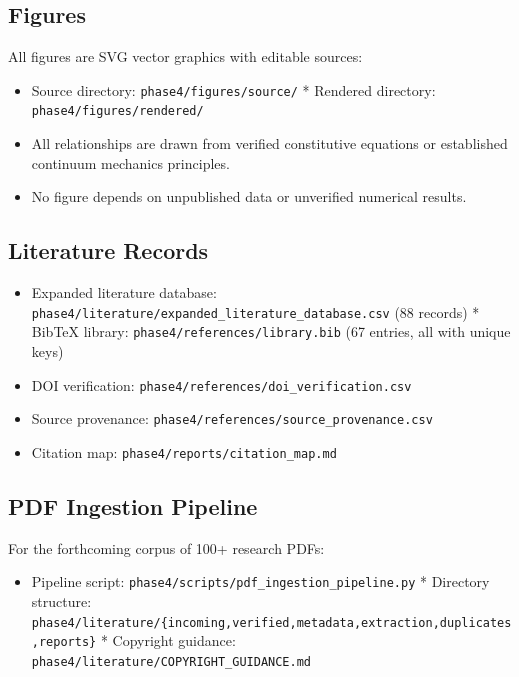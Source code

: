 \subsection{Figures}

All figures are SVG vector graphics with editable sources:

\begin{itemize}
\item Source directory: \texttt{phase4/figures/source/}
* Rendered directory: \texttt{phase4/figures/rendered/}
\item All relationships are drawn from verified constitutive equations or established continuum mechanics principles.
\item No figure depends on unpublished data or unverified numerical results.
\end{itemize}

\subsection{Literature Records}

\begin{itemize}
\item Expanded literature database: \texttt{phase4/literature/expanded\_literature\_database.csv} (88 records)
* BibTeX library: \texttt{phase4/references/library.bib} (67 entries, all with unique keys)
\item DOI verification: \texttt{phase4/references/doi\_verification.csv}
\item Source provenance: \texttt{phase4/references/source\_provenance.csv}
\item Citation map: \texttt{phase4/reports/citation\_map.md}
\end{itemize}

\subsection{PDF Ingestion Pipeline}

For the forthcoming corpus of 100+ research PDFs:

\begin{itemize}
\item Pipeline script: \texttt{phase4/scripts/pdf\_ingestion\_pipeline.py}
* Directory structure: \texttt{phase4/literature/\{incoming,verified,metadata,extraction,duplicates,reports\}}
* Copyright guidance: \texttt{phase4/literature/COPYRIGHT\_GUIDANCE.md}
\end{itemize}

